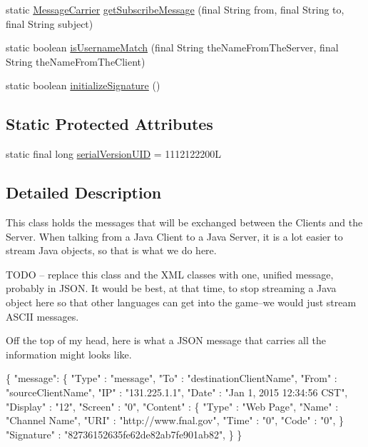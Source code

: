 \begin{DoxyCompactItemize}
\item 
static \hyperlink{classgov_1_1fnal_1_1ppd_1_1dd_1_1chat_1_1MessageCarrier}{Message\-Carrier} \hyperlink{classgov_1_1fnal_1_1ppd_1_1dd_1_1chat_1_1MessageCarrier_abe59d0d2e555a9c418b51ca931647070}{get\-Subscribe\-Message} (final String from, final String to, final String subject)
\item 
static boolean \hyperlink{classgov_1_1fnal_1_1ppd_1_1dd_1_1chat_1_1MessageCarrier_abeb424991e7911d1efd533b61e35fd6a}{is\-Username\-Match} (final String the\-Name\-From\-The\-Server, final String the\-Name\-From\-The\-Client)
\item 
static boolean \hyperlink{classgov_1_1fnal_1_1ppd_1_1dd_1_1chat_1_1MessageCarrier_a5ddfee4147bfa09f7f059dfaab267da7}{initialize\-Signature} ()
\end{DoxyCompactItemize}
\subsection*{Static Protected Attributes}
\begin{DoxyCompactItemize}
\item 
static final long \hyperlink{classgov_1_1fnal_1_1ppd_1_1dd_1_1chat_1_1MessageCarrier_a9baff4617fbbc2df811eae214ec9980c}{serial\-Version\-U\-I\-D} = 1112122200\-L
\end{DoxyCompactItemize}


\subsection{Detailed Description}
This class holds the messages that will be exchanged between the Clients and the Server. When talking from a Java Client to a Java Server, it is a lot easier to stream Java objects, so that is what we do here.

T\-O\-D\-O -- replace this class and the X\-M\-L classes with one, unified message, probably in J\-S\-O\-N. It would be best, at that time, to stop streaming a Java object here so that other languages can get into the game--we would just stream A\-S\-C\-I\-I messages.

Off the top of my head, here is what a J\-S\-O\-N message that carries all the information might looks like.


\begin{DoxyPre}
\{ "message": \{
    "Type"    : "message",
    "To"      : "destinationClientName",
    "From"    : "sourceClientName",
    "IP"      : "131.225.1.1",
    "Date"    : "Jan 1, 2015 12:34:56 CST",
    "Display" : "12",
    "Screen"  : "0",
    "Content" : \{
            "Type" : "Web Page",
         "Name" : "Channel Name",
         "URI"  : "http://www.fnal.gov",
         "Time" : "0",
         "Code" : "0",         
    \}
    "Signature" : "82736152635fe62de82ab7fe901ab82",
  \}
\}
\end{DoxyPre}


